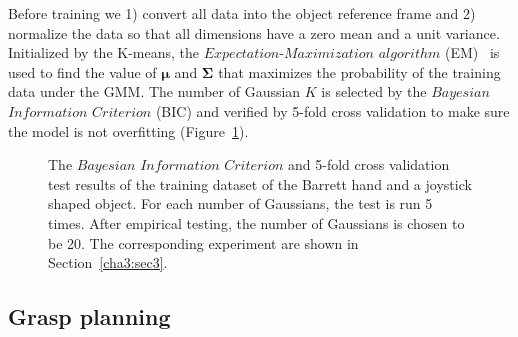 Before training we 1) convert all data into the object reference frame and 2) normalize the data so that all dimensions have a zero mean and a unit variance. Initialized by the K-means, the $Expectation$-$Maximization$ $algorithm$ (EM)~\citep{dempster1977maximum} is used to find the value of $\boldsymbol\mu$ and $\boldsymbol\Sigma$ that maximizes the probability of the training data under the GMM. The number of Gaussian $K$ is selected by the $Bayesian$ $Information$ $Criterion$ (BIC) and verified by 5-fold cross validation to make sure the model is not overfitting (Figure~\ref{bicxv}).

\begin{figure}
  \centering

  \caption{\scriptsize{The $Bayesian$ $Information$ $Criterion$ and 5-fold cross validation test results of the training dataset of the Barrett hand and a joystick shaped object. For each number of Gaussians, the test is run 5 times. After empirical testing, the number of Gaussians is chosen to be 20. The corresponding experiment are shown in Section~\ref{cha3:sec3}.}
}
    \label{bicxv}
\end{figure}

\subsection{Grasp planning}
\label{cha3:sec2:plangrasp}


